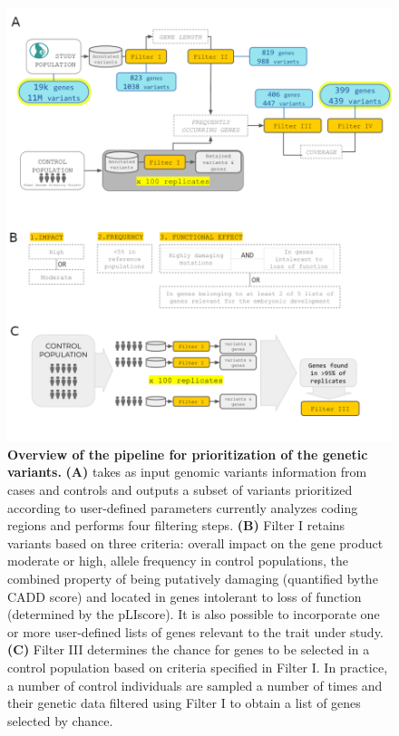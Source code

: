 \begin{figure}[ht]
\centering
\includegraphics[width=\linewidth]{fig/pipe.png}
\caption{\textbf{Overview of the pipeline for prioritization of the genetic variants.} \textbf{(A)} \gp takes as input genomic variants information from cases and controls and outputs a subset of variants prioritized according to user-defined parameters \gp currently analyzes coding regions and performs four filtering steps. \textbf{(B)} Filter I retains variants based on three criteria: overall impact on the gene product moderate or high, allele frequency in control populations, the combined property of being putatively damaging (quantified bythe CADD score) and located in genes intolerant to loss of function (determined by the pLIscore). It is also possible to incorporate one or more user-defined lists of genes relevant to the trait under study. \textbf{(C)} Filter III determines the chance for genes to be selected in a control population based on criteria specified in Filter I. In practice, a number of control individuals are sampled a number of times and their genetic data filtered using Filter I to obtain a list of genes selected by chance.} 
\label{fig:pipeline}
\end{figure}


